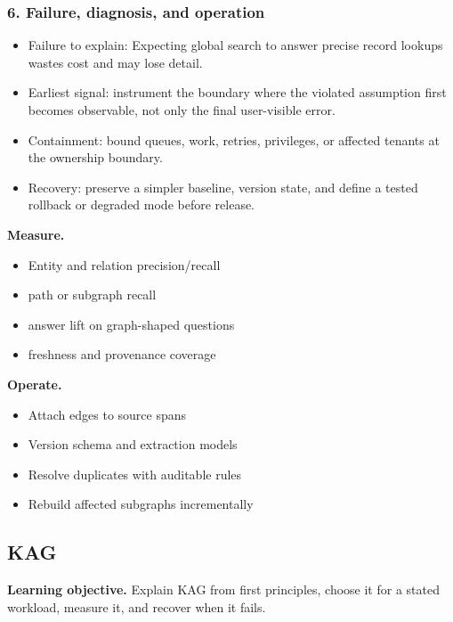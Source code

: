 \subsubsection*{6. Failure, diagnosis, and operation}
\begin{itemize}
\item Failure to explain: Expecting global search to answer precise record lookups wastes cost and may lose detail.
\item Earliest signal: instrument the boundary where the violated assumption first becomes observable, not only the final user-visible error.
\item Containment: bound queues, work, retries, privileges, or affected tenants at the ownership boundary.
\item Recovery: preserve a simpler baseline, version state, and define a tested rollback or degraded mode before release.
\end{itemize}
\textbf{Measure.}\begin{itemize}
\item Entity and relation precision/recall
\item path or subgraph recall
\item answer lift on graph-shaped questions
\item freshness and provenance coverage
\end{itemize}
\textbf{Operate.}\begin{itemize}
\item Attach edges to source spans
\item Version schema and extraction models
\item Resolve duplicates with auditable rules
\item Rebuild affected subgraphs incrementally
\end{itemize}
\subsection{KAG}
\textbf{Learning objective.} Explain KAG from first principles, choose it for a stated workload, measure it, and recover when it fails.
